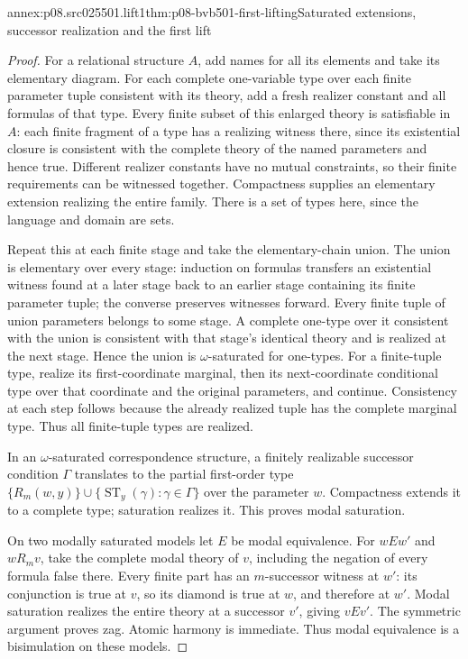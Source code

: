 \begin{annexitem}{annex:p08.src025501.lift1}{thm:p08-bvb501-first-lifting}{Saturated extensions, successor realization and the first lift}
\begin{proof}
For a relational structure \(A\), add names for all its elements and
take its elementary diagram. For each complete one-variable type over
each finite parameter tuple consistent with its theory, add a fresh
realizer constant and all formulas of that type. Every finite subset of
this enlarged theory is satisfiable in \(A\): each finite fragment of
a type has a realizing witness there, since its existential closure is
consistent with the complete theory of the named parameters and hence
true. Different realizer constants have no mutual constraints, so their
finite requirements can be witnessed together. Compactness supplies an
elementary extension realizing the entire family. There is a set of types
here, since the language and domain are sets.

Repeat this at each finite stage and take the elementary-chain union.
The union is elementary over every stage: induction on formulas transfers
an existential witness found at a later stage back to an earlier stage
containing its finite parameter tuple; the converse preserves witnesses
forward. Every finite tuple of union parameters belongs to some stage.
A complete one-type over it consistent with the union is consistent with
that stage's identical theory and is realized at the next stage. Hence
the union is \(\omega\)-saturated for one-types. For a finite-tuple type,
realize its first-coordinate marginal, then its next-coordinate conditional
type over that coordinate and the original parameters, and continue.
Consistency at each step follows because the already realized tuple has
the complete marginal type. Thus all finite-tuple types are realized.

In an \(\omega\)-saturated correspondence structure, a finitely
realizable successor condition \(\Gamma\) translates to the partial
first-order type
\(\{R_m(w,y)\}\cup\{\operatorname{ST}_y(\gamma):\gamma\in\Gamma\}\)
over the parameter \(w\). Compactness extends it to a complete type;
saturation realizes it. This proves modal saturation.

On two modally saturated models let \(E\) be modal equivalence.
For \(wEw'\) and \(wR_mv\), take the complete modal theory of \(v\),
including the negation of every formula false there. Every finite part has
an \(m\)-successor witness at \(w'\): its conjunction is true at
\(v\), so its diamond is true at \(w\), and therefore at \(w'\).
Modal saturation realizes the entire theory at a successor \(v'\),
giving \(vEv'\). The symmetric argument proves zag. Atomic harmony
is immediate. Thus modal equivalence is a bisimulation on these models.


\end{proof}
\end{annexitem}
